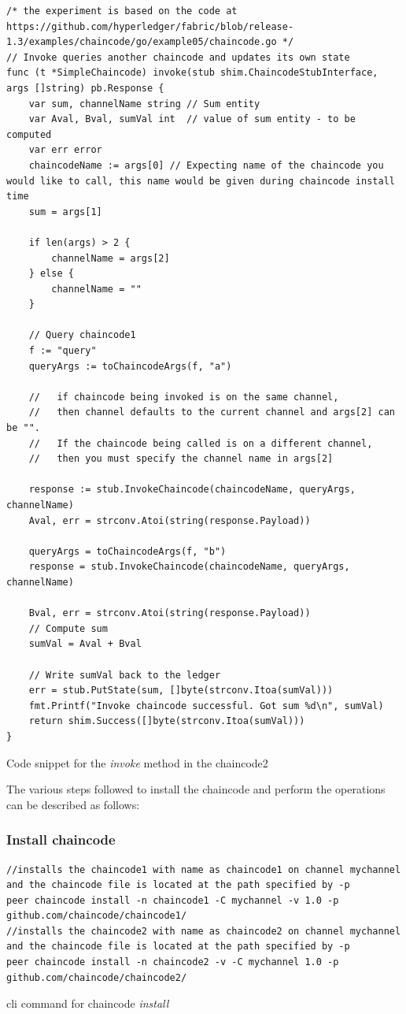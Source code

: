 \documentclass[
  a4paper,  %
  twoside,  %
  bibliography=totoc,
  headsepline,
  cleardoublepage=empty,
  parskip=half,
  draft=false
]{scrbook}
\begin{document}
\begin{Listing}[h!]
\begin{lstlisting}
/* the experiment is based on the code at https://github.com/hyperledger/fabric/blob/release-1.3/examples/chaincode/go/example05/chaincode.go */
// Invoke queries another chaincode and updates its own state
func (t *SimpleChaincode) invoke(stub shim.ChaincodeStubInterface, args []string) pb.Response {
	var sum, channelName string // Sum entity
	var Aval, Bval, sumVal int  // value of sum entity - to be computed
	var err error
	chaincodeName := args[0] // Expecting name of the chaincode you would like to call, this name would be given during chaincode install time
	sum = args[1]

	if len(args) > 2 {
		channelName = args[2]
	} else {
		channelName = ""
	}

	// Query chaincode1
	f := "query"
	queryArgs := toChaincodeArgs(f, "a")

	//   if chaincode being invoked is on the same channel,
	//   then channel defaults to the current channel and args[2] can be "".
	//   If the chaincode being called is on a different channel,
	//   then you must specify the channel name in args[2]

	response := stub.InvokeChaincode(chaincodeName, queryArgs, channelName)
	Aval, err = strconv.Atoi(string(response.Payload))
	
	queryArgs = toChaincodeArgs(f, "b")
	response = stub.InvokeChaincode(chaincodeName, queryArgs, channelName)
	
	Bval, err = strconv.Atoi(string(response.Payload))
	// Compute sum
	sumVal = Aval + Bval

	// Write sumVal back to the ledger
	err = stub.PutState(sum, []byte(strconv.Itoa(sumVal)))
	fmt.Printf("Invoke chaincode successful. Got sum %d\n", sumVal)
	return shim.Success([]byte(strconv.Itoa(sumVal)))
}
\end{lstlisting}
\caption{Code snippet for the \textit{invoke} method in the chaincode2}
\label{lst:c2i}
\end{Listing}
\clearpage
The various steps followed to install the chaincode and perform the operations can be described as follows:
\subsubsection{Install chaincode}
\begin{Listing}[h!]
\begin{lstlisting}
//installs the chaincode1 with name as chaincode1 on channel mychannel and the chaincode file is located at the path specified by -p
peer chaincode install -n chaincode1 -C mychannel -v 1.0 -p github.com/chaincode/chaincode1/
//installs the chaincode2 with name as chaincode2 on channel mychannel and the chaincode file is located at the path specified by -p
peer chaincode install -n chaincode2 -v -C mychannel 1.0 -p github.com/chaincode/chaincode2/
\end{lstlisting}
\caption{cli command for chaincode \textit{install}}
\label{lst:ci}
\end{Listing}
\end{document}
